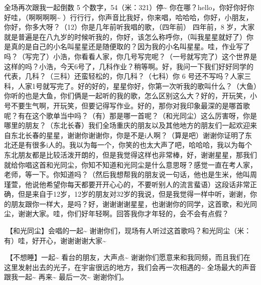 \documentclass[
]{book}
\begin{document}
全场再次跟我一起倒数 5 个数字，54（米：321）停\textasciitilde{} 你在哪？hello，你好你好你好哇，（啊啊啊啊\textasciitilde{} ）行行行，你声音比我好，你来唱，哈哈哈，你好，小朋友，你好，你多大呀？（12）你是几年前听我唱的歌，（四年前） 四年前，8 岁，大家就是普遍是在八九岁的时候听我的，你好，该怎么称呼你，（叫我星星就好了）你是真的是自己的小名叫星星还是随便取的？因为我的小名叫星星。哇，作业写了吗？（写完了）小浩，你看看人家，你几号写完呢？（一号就写完了）这个世界是这样的吗？小浩，今天6号了，几科作业？稍等啊。好，我问一下我们好好同学的代表，几科？（三科）还蛮轻松的，你几科？（七科）你 6 号还不写吗？人家三科，人家1号就写完了。好的好的，星星你好，你第一次听我的歌叫什么？（大鱼）你听的也是大鱼，你们俩是一起听的我的歌，怎么区别这么大？好的，开玩笑，小号不要生气啊，开玩笑，但要记得写作业。好的，那你对我印象最深的是哪首歌呢？有在这个歌单当中吗？（有）那是哪一首呢？（和光同尘）这么厉害呀，你是哪里的朋友？（东北长春）我们全场重庆的朋友以及其他地方的朋友们一起欢迎来自东北长春的星星，谢谢你谢谢你，你是不是i人啊？（算是吧）谢谢你证明了东北还是有很多i人的。我以为每一个，你笑的也太大声了吧，哈哈哈，我以为每个东北朋友都是比较活泼开朗的，但是我觉得这样也非常棒，好，谢谢星星，那我们就给你唱这首和光同尘，你知不知道和光同尘是什么意思呀？感觉一直在考人家，老师，等一下。你知道吗？（然后我想帮我的朋友说一句话，他也是生米，他叫周瑾萱，他说他希望你每天都要开开心心的，不要听别人的流言蜚语）这段话非常正确，但是来自于12岁，12岁的朋友对32岁的我说，但是我觉得一样中听，谢谢，你的朋友跟你一样大，是吗？好，谢谢谢谢星星，也谢谢你的同学，这首歌，和光同尘，谢谢大家。哇，你们好年轻啊。回答我你才年轻的，会不会有点假？

🎵【和光同尘】会唱的一起\textasciitilde{} 谢谢你们，现场有人听过这首歌吗？和光同尘（米：有）哇，好开心，谢谢谢谢大家\textasciitilde{}

🎵【不想睡】一起\textasciitilde{} 看台的朋友，大声点\textasciitilde{} 谢谢你们愿意来和我同频，而且我们在这里发射出去的光子，在宇宙很远的地方，我们会再一次相遇的\textasciitilde{} 全场最大的声音跟我一起\textasciitilde{} 再来\textasciitilde{} 最后一次\textasciitilde{} 谢谢你们。
\end{document}
